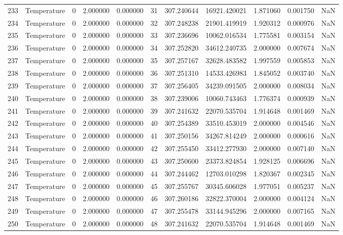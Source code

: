 \begin{tabular}{llrrrrrrrrr}
233 & Temperature & 0 & 2.000000 & 0.000000 & 31 & 307.240644 & 16921.420021 & 1.871060 & 0.001750 & NaN \\
234 & Temperature & 0 & 2.000000 & 0.000000 & 32 & 307.248238 & 21901.419919 & 1.920312 & 0.000976 & NaN \\
235 & Temperature & 0 & 2.000000 & 0.000000 & 33 & 307.236696 & 10062.016534 & 1.775581 & 0.003154 & NaN \\
236 & Temperature & 0 & 2.000000 & 0.000000 & 34 & 307.252820 & 34612.240735 & 2.000000 & 0.007674 & NaN \\
237 & Temperature & 0 & 2.000000 & 0.000000 & 35 & 307.257167 & 32628.483582 & 1.997559 & 0.005853 & NaN \\
238 & Temperature & 0 & 2.000000 & 0.000000 & 36 & 307.251310 & 14533.426983 & 1.845052 & 0.003740 & NaN \\
239 & Temperature & 0 & 2.000000 & 0.000000 & 37 & 307.256405 & 34239.091505 & 2.000000 & 0.008034 & NaN \\
240 & Temperature & 0 & 2.000000 & 0.000000 & 38 & 307.239006 & 10060.743463 & 1.776374 & 0.000939 & NaN \\
241 & Temperature & 0 & 2.000000 & 0.000000 & 39 & 307.241632 & 22070.535704 & 1.914648 & 0.001469 & NaN \\
242 & Temperature & 0 & 2.000000 & 0.000000 & 40 & 307.254389 & 33510.453019 & 2.000000 & 0.004546 & NaN \\
243 & Temperature & 0 & 2.000000 & 0.000000 & 41 & 307.250156 & 34267.814249 & 2.000000 & 0.000616 & NaN \\
244 & Temperature & 0 & 2.000000 & 0.000000 & 42 & 307.255450 & 33412.277930 & 2.000000 & 0.007140 & NaN \\
245 & Temperature & 0 & 2.000000 & 0.000000 & 43 & 307.250600 & 23373.824854 & 1.928125 & 0.006696 & NaN \\
246 & Temperature & 0 & 2.000000 & 0.000000 & 44 & 307.244462 & 12703.010298 & 1.820367 & 0.002345 & NaN \\
247 & Temperature & 0 & 2.000000 & 0.000000 & 45 & 307.255767 & 30345.606028 & 1.977051 & 0.005237 & NaN \\
248 & Temperature & 0 & 2.000000 & 0.000000 & 46 & 307.260186 & 32822.370004 & 2.000000 & 0.004124 & NaN \\
249 & Temperature & 0 & 2.000000 & 0.000000 & 47 & 307.255478 & 33144.945296 & 2.000000 & 0.007165 & NaN \\
250 & Temperature & 0 & 2.000000 & 0.000000 & 48 & 307.241632 & 22070.535704 & 1.914648 & 0.001469 & NaN \\

\end{tabular}
